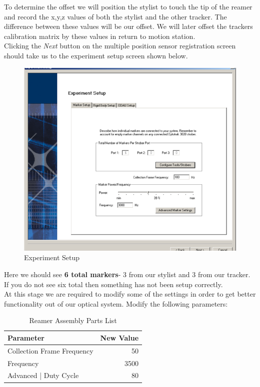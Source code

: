 \documentclass[pdftex,11pt,letterpaper]{article}
\begin{document}
To determine the offset we will position the stylist to touch the tip of the reamer and record the x,y,z values of both the stylist and the other tracker. The difference between these values will be our offset. We will later offset the trackers calibration matrix by these values in return to motion station. \\

Clicking the \textit{Next} button on the multiple position sensor registration screen should take us to the experiment setup screen shown below.\\

\begin{figure}[ht!]
\centering
\includegraphics[width=150mm]{./images/exper_setup}
\caption{Experiment Setup}
\end{figure}

Here we should see \textbf{6 total markers}- 3 from our stylist and 3 from our tracker. If you do not see six total then something has not been setup correctly. \\

At this stage we are required to modify some of the settings in order to get better functionality out of our optical system. Modify the following parameters: 

\begin{table}[h!]
\begin{center}
\begin{tabular}{l*{1}{r}}
Parameter             & New Value \\
\hline
Collection Frame Frequency & 50   \\
Frequency & 3500   \\
Advanced | Duty Cycle & 80   \\
\end{tabular}
	\caption{Reamer Assembly Parts List}
\end{center}
\end{table}
\end{document}
